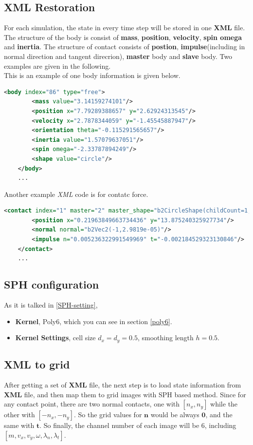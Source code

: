 \subsection{XML Restoration}
For each simulation, the state in every time step will be stored in one \textbf{XML} file. The structure of the body is consist of \textbf{mass}, \textbf{position}, \textbf{velocity}, \textbf{spin omega} and \textbf{inertia}. The structure of contact consists of \textbf{postion}, \textbf{impulse}(including in normal direction and tangent direcrion), \textbf{master} body and \textbf{slave} body. Two examples are given in the following.\\

This is an example of one body information is given below.
\begin{lstlisting}[language=XML]
    <body index="86" type="free">
        <mass value="3.14159274101"/>
        <position x="7.79289388657" y="2.62924313545"/>
        <velocity x="2.7878344059" y="-1.45545887947"/>
        <orientation theta="-0.115291565657"/>
        <inertia value="1.57079637051"/>
        <spin omega="-2.33787894249"/>
        <shape value="circle"/>
    </body>
    ...
\end{lstlisting}
Another example \textit{XML} code is for contatc force.
\begin{lstlisting}[language=XML]
    <contact index="1" master="2" master_shape="b2CircleShape(childCount=1, pos=b2Vec2(0,0), radius=1.2000000476837158, type=0,)" slave="97" slave_shape="b2CircleShape(childCount=1, pos=b2Vec2(0,0), radius=1.2000000476837158, type=0, )">
        <position x="0.21963849663734436" y="13.875240325927734"/>
        <normal normal="b2Vec2(-1,2.9819e-05)"/>
        <impulse n="0.005236322991549969" t="-0.002184529323130846"/>
    </contact>
    ...
\end{lstlisting}

\subsection{SPH configuration}
As it is talked in \ref{SPH-setting}, 
\begin{itemize}
    \item \textbf{Kernel}, Poly6, which you can see in section \ref{poly6}.
    \item \textbf{Kernel Settings}, cell size $d_x=d_y=0.5$, smoothing length $h=0.5$.
\end{itemize}
\subsection{XML to grid}
After getting a set of \textbf{XML} file, the next step is to load state information from \textbf{XML} file, and then map them to grid images with SPH based method. Since for any contact point, there are two normal contacts, one with $[n_x, n_y]$ while the other with $[-n_x, -n_y]$. So the grid values for $\pmb{n}$ would be always $\pmb{0}$, and the same  with $\pmb{t}$. So finally, the channel number of each image will be $6$, including $[m, v_x, v_y, \omega, \lambda_n, \lambda_t]$. \\

